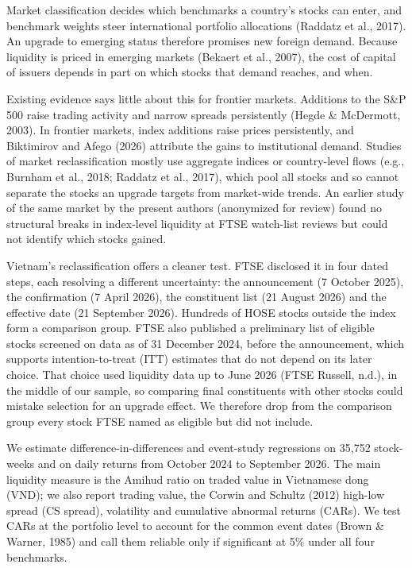 \documentclass[review,authoryear,12pt]{elsarticle}
\begin{document}
Market classification decides which benchmarks a country's stocks can
enter, and benchmark weights steer international portfolio allocations
(Raddatz et al., 2017). An upgrade to emerging status therefore promises
new foreign demand. Because liquidity is priced in emerging markets
(Bekaert et al., 2007), the cost of capital of issuers depends in part
on which stocks that demand reaches, and when.

Existing evidence says little about this for frontier markets. Additions
to the S\&P 500 raise trading activity and narrow spreads persistently
(Hegde \& McDermott, 2003). In frontier markets, index additions raise
prices persistently, and Biktimirov and Afego (2026) attribute the gains
to institutional demand. Studies of market reclassification mostly use
aggregate indices or country-level flows (e.g., Burnham et al., 2018;
Raddatz et al., 2017), which pool all stocks and so cannot separate the
stocks an upgrade targets from market-wide trends. An earlier study of
the same market by the present authors (anonymized for review) found no
structural breaks in index-level liquidity at FTSE watch-list reviews
but could not identify which stocks gained.

Vietnam's reclassification offers a cleaner test. FTSE disclosed it in
four dated steps, each resolving a different uncertainty: the
announcement (7 October 2025), the confirmation (7 April 2026), the
constituent list (21 August 2026) and the effective date (21 September
2026). Hundreds of HOSE stocks outside the index form a comparison
group. FTSE also published a preliminary list of eligible stocks
screened on data as of 31 December 2024, before the announcement, which
supports intention-to-treat (ITT) estimates that do not depend on its
later choice. That choice used liquidity data up to June 2026 (FTSE
Russell, n.d.), in the middle of our sample, so comparing final
constituents with other stocks could mistake selection for an upgrade
effect. We therefore drop from the comparison group every stock FTSE
named as eligible but did not include.

We estimate difference-in-differences and event-study regressions on
35,752 stock-weeks and on daily returns from October 2024 to September
2026. The main liquidity measure is the Amihud ratio on traded value in
Vietnamese dong (VND); we also report trading value, the Corwin and
Schultz (2012) high-low spread (CS spread), volatility and cumulative
abnormal returns (CARs). We test CARs at the portfolio level to account
for the common event dates (Brown \& Warner, 1985) and call them
reliable only if significant at 5\% under all four benchmarks.
\end{document}
